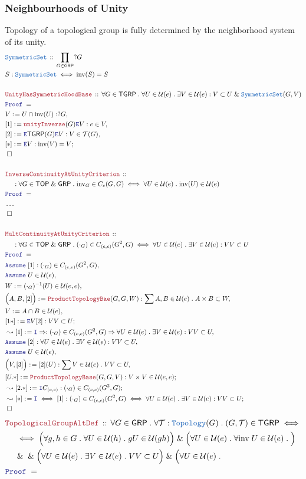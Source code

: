 \documentclass[12pt]{scrartcl}
\newcommand{\TYPE}[1]{\textcolor{NavyBlue}{\mathtt{#1}}}
\newcommand{\LOGIC}[1]{\textcolor{Blue}{\mathtt{#1}}}
\newcommand{\THM}[1]{\textcolor{Maroon}{\mathtt{#1}}}
\renewcommand{\.}{\; . \;}
\newcommand{\de}{: \kern 0.1pc =}
\newcommand{\Theorem}[2]{& \THM{#1} \, :: \, #2 \\ & \Proof = \\ }
\newcommand{\DeclareType}[2]{& \TYPE{#1} \, :: \, #2 \\}
\newcommand{\DefineType}[3]{& #1 : \TYPE{#2} \iff #3 \\}
\newcommand{\NewLine}{\\ & \kern 1pc}
\newcommand{\Page}[1]{ \begin{align*} #1 \end{align*}   }
\newcommand{\NoProof}{ & \ldots \\ \EndProof}
\renewcommand{\And}{\; \& \;}
\newcommand{\Imply}{\Rightarrow}
\newcommand{\Say}[3]{& #1 \de #2 : #3, \\}
\newcommand{\SayIn}[3]{& #1 \de #2 \in #3, \\}
\newcommand{\Conclude}[3]{& #1 \de #2 : #3; \\}
\newcommand{\Derive}[3]{& \leadsto #1 \de #2 : #3, \\}
\newcommand{\DeriveConclude}[3]{& \leadsto #1 \de #2 : #3 ; \\}
\newcommand{\Assume}[2]{& \LOGIC{Assume} \; #1 : #2, \\}
\newcommand{\AssumeIn}[2]{& \LOGIC{Assume} \; #1 \in #2, \\}
\newcommand{\Intro}{\LOGIC{I}}
\newcommand{\Elim}{\LOGIC{E}}
\newcommand{\QED}{\; \square}
\newcommand{\EndProof}{& \QED \\}
\newcommand{\Proof}{\LOGIC{Proof} \; }
\newcommand{\TOP}{\mathsf{TOP}}
\newcommand{\T}{\mathcal{T}}
\renewcommand{\U}{\mathcal{U}}
\newcommand{\GRP}{\mathsf{GRP}}
\renewcommand{\SS}{\TYPE{SymmetricSet}}
\newcommand{\inv}{\mathrm{inv}}
\newcommand{\TGRP}{\mathsf{TGRP}}
\begin{document}
\subsubsection{Neighbourhoods of Unity}
Topology of a topological group 
is fully determined by the neighborhood system 
of its unity.
\Page{
	\DeclareType{\SS}{\prod_{G \in \GRP} ?G}
	\DefineType{S}{\SS}{\inv(S) = S}
	\\
	\Theorem{UnityHasSymmetricHoodBase}
	{
		\forall G \in \TGRP \.
		\forall U \in \U(e) \.
		\exists V \in \U(e) :
		V \subset U \And \SS(G,V)
	}
	\Say{V}{U \cap \inv(U)}{?G}
	\Say{[1]}{\THM{unityInverse}(G)\Elim V}{e \in V}
	\Say{[2]}{\Elim \TGRP(G)\Elim V}
	{
		V \in \T(G)	
	}
	\Conclude{[*]}{\Elim V}{\inv(V) = V}
	\EndProof
	\\
	\Theorem{InverseContinuityAtUnityCriterion}
	{
		\NewLine :		
		\forall G \in \TOP \And \GRP \.
		\inv_G \in C_e(G,G) 
		\iff
		\forall U \in \U(e) \.
		\inv(U) \in \U(e)
	}
	\NoProof
	\\
	\Theorem{MultContinuityAtUnityCriterion}
	{
		\NewLine :		
		\forall G \in \TOP \And \GRP \.
		(\cdot_G) \in C_{(e,e)}(G^2,G) 
		\iff
		\forall U \in \U(e) \.
		\exists V \in \U(e) :
		VV \subset U
	}
	\Assume{[1]}{(\cdot_G) \in C_{(e,e)}(G^2,G)}
	\AssumeIn{U}{\U(e)}
	\SayIn{W}{(\cdot_G)^{-1}(U)}{\U(e,e)}
	\Say{\Big(A,B,[2]\Big)}{\THM{ProductTopologyBae}(G,G,W)}
	{
		\sum A,B \in \U(e) \.
		A \times B \subset W  
	}
	\SayIn{V}{A \cap B}{\U(e)}
	\Conclude{[1*]}{\Elim V[2]}{VV \subset U}
	\Derive{[1]}{\Intro \Imply}
	{
		(\cdot_G) \in C_{(e,e)}(G^2,G) 
		\Imply
		\forall U \in \U(e) \.
		\exists V \in \U(e) :
		VV \subset U
	}
	\Assume{[2]}
	{
		\forall U \in \U(e) \.
		\exists V \in \U(e) :
		VV \subset U
	}
	\AssumeIn{U}{\U(e)}
	\Say{\Big(V,[3]\Big)}
	{
		[2](U)	
	}
	{
		\sum V \in \U(e) \. VV \subset U
	}
	\Conclude{[U.*]}{\THM{ProductTopologyBase}(G,G,V)}{V \times V \in \U(e,e)}
	\DeriveConclude{[2.*]}{\Intro C_{(e,e)}}{(\cdot_G) \in C_{(e,e)}(G^2,G)} 
	\DeriveConclude{[*]}{\Intro \iff[1]}
	{
		(\cdot_G) \in C_{(e,e)}(G^2,G) 
		\iff
		\forall U \in \U(e) \.
		\exists V \in \U(e) :
		VV \subset U 
	}
	\EndProof
}\Page{
	\Theorem{TopologicalGroupAltDef}
	{
		\forall G \in \GRP \.
		\forall \T : \TYPE{Topology}(G) \.
		(G,\T) \in \TGRP 
		\iff
		\NewLine
		\iff
		\Big(
			\forall g,h \in G \. 
			\forall U \in \U(h) \.
			 gU \in \U(gh) 
		\Big)
		\And
		\Big(
			\forall U \in \U(e) \.
			\forall \inv \; U \in \U(e) \.
		\Big)
		\NewLine \And
		\And
		\Big(
			\forall U \in \U(e) \.
			\exists V \in \U(e) \.
			VV \subset U
		\Big)
		\And
		\Big(
			\forall U \in \U(e) \.
}}
\end{document}
